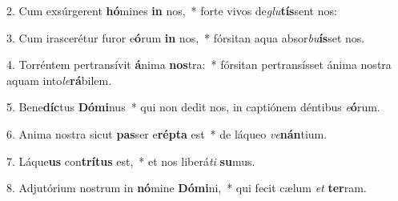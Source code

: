 2. Cum exsúrgerent \textbf{hó}mines \textbf{in} nos,~*  forte vivos de\textit{glu}\textbf{tís}sent nos:\

3. Cum irascerétur furor e\textbf{ó}rum \textbf{in} nos,~*  fórsitan aqua absor\textit{bu}\textbf{ís}set nos.\

4. Torréntem pertransívit \textbf{á}nima \textbf{nos}tra:~*  fórsitan pertransísset ánima nostra aquam into\textit{le}\textbf{rá}bilem.\

5. Bene\textbf{díc}tus \textbf{Dó}\textbf{mi}nus~*  qui non dedit nos, in captiónem déntibus \textit{e}\textbf{ó}rum.\

6. Anima nostra sicut \textbf{pas}ser e\textbf{rép}\textbf{ta} est~*  de láqueo \textit{ve}\textbf{nán}tium.\

7. Láque\textbf{us} con\textbf{trí}\textbf{tus} est,~*  et nos liberá\textit{ti} \textbf{su}mus.\

8. Adjutórium nostrum in \textbf{nó}mine \textbf{Dó}\textbf{mi}ni,~*  qui fecit cælum \textit{et} \textbf{ter}ram.\

